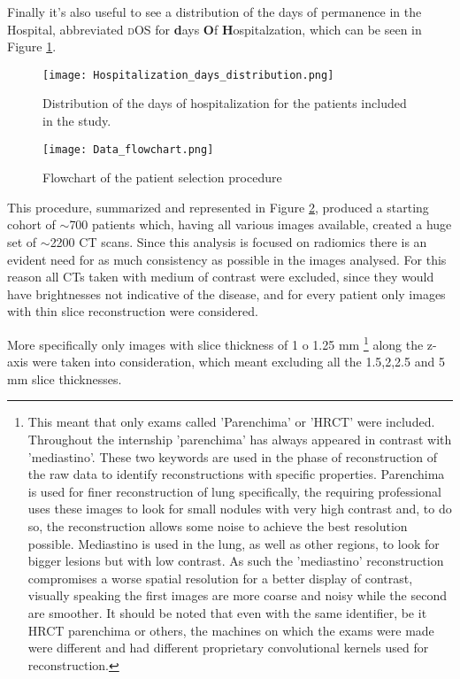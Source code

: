 Finally it's also useful to see a distribution of the days of permanence in the Hospital, abbreviated {\scshape dOS} for \textbf{d}ays \textbf{O}f \textbf{H}ospitalzation, which can be seen in Figure \ref{fig:dOSDistr}.

\begin{figure}[htbp]
\texttt{[image: Hospitalization\_days\_distribution.png]}
\caption{Distribution of the days of hospitalization for the patients included in the study.\label{fig:dOSDistr}}
\end{figure}

\begin{figure}[htbp]
\texttt{[image: Data\_flowchart.png]}
\caption{Flowchart of the patient selection procedure \label{fig:dataSelFlowchart}}
\end{figure}

This procedure, summarized and represented in Figure \ref{fig:dataSelFlowchart}, produced a starting cohort of $\sim$700 patients which, having all various images available, created a huge set of $\sim$2200 CT scans. Since this analysis is focused on radiomics there is an evident need for as much consistency as possible in the images analysed. For this reason all CTs taken with medium of contrast were excluded, since they would have brightnesses not indicative of the disease, and for every patient only images with thin slice reconstruction were considered. 

More specifically only images with slice thickness of 1 o 1.25 mm
\footnote{This meant that only exams called 'Parenchima' or  'HRCT' were included. Throughout the internship 'parenchima' has always appeared in contrast with 'mediastino'. These two keywords are used in the phase of reconstruction of the raw data to identify reconstructions with specific properties. Parenchima is used for finer reconstruction of lung specifically, the requiring professional uses these images to look for small nodules with very high contrast and, to do so, the reconstruction allows some noise to achieve the best resolution possible. Mediastino is used in the lung, as well as other regions, to look for bigger lesions but with low contrast. As such the 'mediastino' reconstruction compromises a worse spatial resolution for a better display of contrast, visually speaking the first images are more coarse and noisy while the second are smoother. It should be noted that even with the same identifier, be it HRCT parenchima or others, the machines on which the exams were made were different and had different proprietary convolutional kernels used for reconstruction.} 
along the z-axis were taken into consideration, which meant excluding all the 1.5,2,2.5 and 5 mm slice thicknesses.

